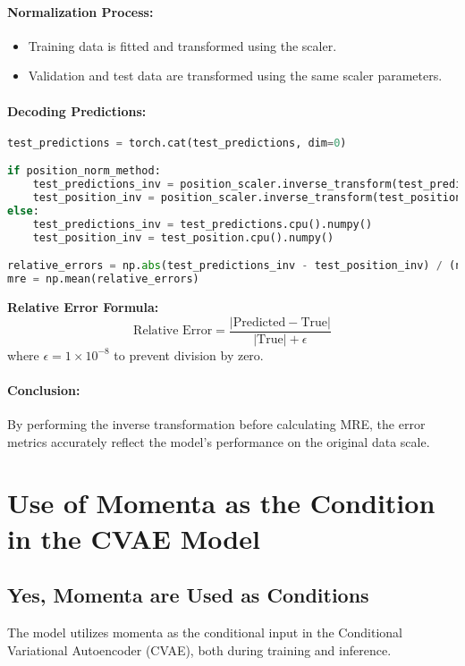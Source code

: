\documentclass[10pt]{article}
\begin{document}
\paragraph{Normalization Process:}
\begin{itemize}
    \item Training data is fitted and transformed using the scaler.
    \item Validation and test data are transformed using the same scaler parameters.
\end{itemize}

\paragraph{Decoding Predictions:}
\begin{lstlisting}[language=Python, caption=Inverse Transformation and MRE Calculation]
test_predictions = torch.cat(test_predictions, dim=0)

if position_norm_method:
    test_predictions_inv = position_scaler.inverse_transform(test_predictions.cpu().numpy())
    test_position_inv = position_scaler.inverse_transform(test_position.cpu().numpy())
else:
    test_predictions_inv = test_predictions.cpu().numpy()
    test_position_inv = test_position.cpu().numpy()

relative_errors = np.abs(test_predictions_inv - test_position_inv) / (np.abs(test_position_inv) + 1e-8)
mre = np.mean(relative_errors)
\end{lstlisting}

\textbf{Relative Error Formula:}
\[
\text{Relative Error} = \frac{|\text{Predicted} - \text{True}|}{|\text{True}| + \epsilon}
\]
where \( \epsilon = 1 \times 10^{-8} \) to prevent division by zero.

\paragraph{Conclusion:}
By performing the inverse transformation before calculating MRE, the error metrics accurately reflect the model's performance on the original data scale.

\section{Use of Momenta as the Condition in the CVAE Model}

\subsection{Yes, Momenta are Used as Conditions}
The model utilizes momenta as the conditional input in the Conditional Variational Autoencoder (CVAE), both during training and inference.
\end{document}
